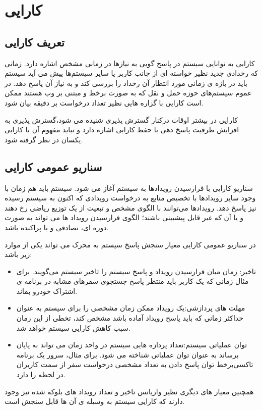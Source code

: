 \chapter{کارایی}
\section{تعریف کارایی}
کارایی به توانایی سیستم در پاسخ گویی به نیازها در زمانی مشخص اشاره دارد. زمانی که رخدادی جدید نظیر خواسته ای از جانب کاربر یا سایر سیستم‌ها پیش می آید سیستم باید در بازه ی زمانی مورد انتظار آن رخداد را بررسی کند و به نیاز آن پاسخ دهد. در عموم سیستم‌های حوزه حمل و نقل که به صورت برخط و مبتنی بر وب هستند ممکن است کارایی با گزاره هایی نظیر تعداد درخواست بر دقیقه بیان شود.

کارایی در بیشتر اوقات درکنار گسترش پذیری شنیده می شود،‌گسترش پذیری به افزایش ظرفیت پاسخ دهی با حفظ کارایی اشاره دارد و نباید مفهوم آن با کارایی یکسان در نظر گرفته شود.
\section{سناریو عمومی کارایی}
سناریو کارایی با فرارسیدن رویداد‌ها به سیستم آغاز می شود. سیستم باید هم زمان با وجود سایر رویدادها با تخصیص منابع به درخواست رویدادی که اکنون به سیستم رسیده نیز پاسخ دهد.
رویدادها می‌توانند با الگوی مشخص و تبعیت از یک توزیع ریاضی رخ دهند و یا آن که غیر قابل پیشبینی باشند؛ ‌الگوی فرارسیدن رویداد ها می تواند به صورت دوره ای، تصادفی و یا پراکنده باشد.

در سناریو عمومی کارایی معیار سنجش پاسخ سیستم به محرک می تواند یکی از موارد زیر باشد:
\begin{itemize}
\item
تاخیر: زمان میان فرارسیدن رویداد و پاسخ سیستم را تاخیر سیستم می‌گویند. برای مثال زمانی که یک کاربر باید منتظر پاسخ جستجوی سفر‌های مشابه در برنامه ی اشتراک خودرو بماند.
\item
مهلت های پردازشی:یک رویداد ممکن زمان مشخصی را برای سیستم به عنوان حداکثر زمانی که باید پاسخ رویداد آماده باشد مشخص کند،‌ تخطی از این زمان سبب کاهش کارایی سیستم خواهد شد.
\item
توان عملیاتی سیستم:تعداد پردازه هایی سیستم در واحد زمان می تواند به پایان برساند به عنوان توان عملیاتی شناخته می شود. برای مثال، سرور یک برنامه ‌تاکسی‌برخط توان پاسخ دادن به تعداد مشخصی درخواست سفر از سمت کاربران در لحظه را دارد.
\end{itemize}
همچنین معیار های دیگری نظیر واریانس تاخیر و تعداد رویداد های بلوکه شده نیز وجود دارند که کارایی سیستم به وسیله ی آن ها قابل سنجش است.

